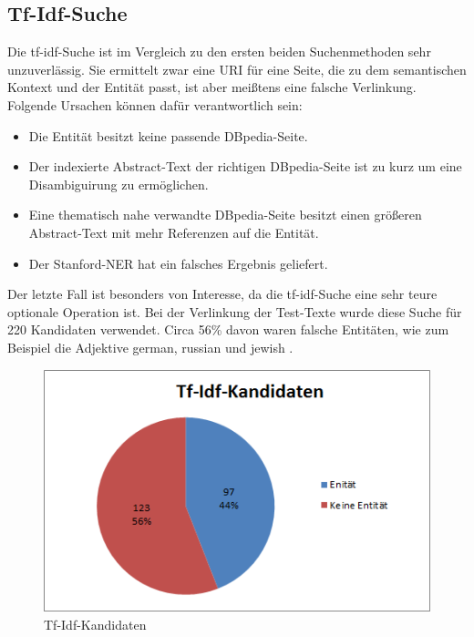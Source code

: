 \documentclass[11pt, a4paper, oneside]{Thesis} %
\begin{document}
\subsection{Tf-Idf-Suche}
Die tf-idf-Suche ist im Vergleich zu den ersten beiden Suchenmethoden sehr unzuverl\"assig. Sie ermittelt zwar eine URI f\"ur eine Seite, die zu dem   semantischen Kontext und der Entit\"at passt, ist aber mei\ss tens eine falsche Verlinkung. Folgende Ursachen k\"onnen daf\"ur verantwortlich sein:
\begin{itemize}
\item Die Entit\"at besitzt keine passende DBpedia-Seite.
\item Der indexierte Abstract-Text der richtigen DBpedia-Seite ist zu kurz um eine Disambiguirung zu erm\"oglichen.
\item Eine thematisch nahe verwandte DBpedia-Seite besitzt einen gr\"o\ss eren Abstract-Text mit mehr Referenzen auf die Entit\"at.
\item Der Stanford-NER hat ein falsches Ergebnis geliefert.
\end{itemize}
Der letzte Fall ist besonders von Interesse, da die tf-idf-Suche eine sehr teure optionale Operation ist. Bei der Verlinkung der Test-Texte wurde diese Suche f\"ur 220 Kandidaten verwendet. Circa 56\% davon waren falsche Entit\"aten, wie zum Beispiel die Adjektive german, russian und jewish .
\begin{figure}[ht!]
\centering
\includegraphics[scale=1]{./tfPrecision.png}
\caption[Tf-Idf-Kandidaten]{Tf-Idf-Kandidaten}
\end{figure}
\end{document}
